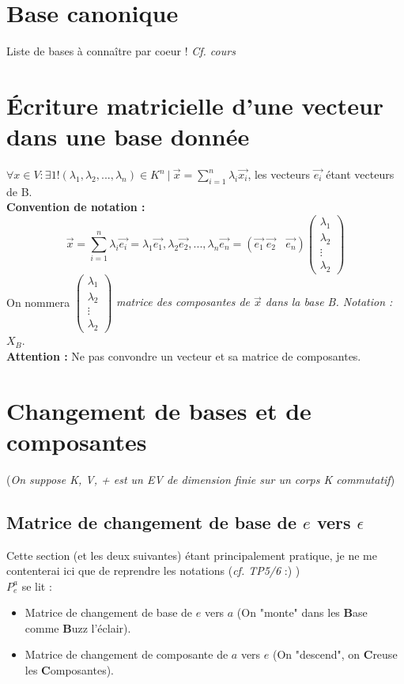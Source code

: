 \documentclass	[11pt, a4paper, openany]{book}
\begin{document}
\section{Base canonique}
Liste de bases à connaître par coeur ! \textit{Cf. cours}

\section{Écriture matricielle d'une vecteur dans une base donnée}
$\forall x \in V : \exists 1!(\lambda_{1}, \lambda_{2}, ..., \lambda_{n}) \in K^{n}\ |\ \vec{x} = \sum_{i=1}^{n} \lambda_{i}\vec{x_{i}}$, les vecteurs $\vec{e_{i}}$ étant vecteurs de B.\\
\textbf{Convention de notation :}\\
$$\vec{x} = \sum_{i=1}^{n}  \lambda_{i}\vec{e_{i}} = \lambda_{1}\vec{e_{1}}, \lambda_{2}\vec{e_{2}}, ..., \lambda_{n}\vec{e_{n}} = (\vec{e_{1}}\ \vec{e_{2}}\ \ \ \ \vec{e_{n}})\begin{pmatrix} 
\lambda_1 \\ 
\lambda_2 \\ 
\vdots\\ 
\lambda_2 \end{pmatrix}$$
On nommera $\begin{pmatrix} 
\lambda_1 \\ 
\lambda_2 \\ 
\vdots\\ 
\lambda_2 \end{pmatrix}$ \textit{matrice des composantes de $\vec{x}$ dans la base B. Notation : $X_B$}.
\\
\textbf{Attention :} Ne pas convondre un vecteur et sa matrice de 
composantes.


\section{Changement de bases et de composantes}
(\textit{On suppose K, V, + est un EV de dimension finie sur un corps K commutatif})\\
\subsection{Matrice de changement de base de $e$ vers $\epsilon$}
Cette section (et les deux suivantes) étant principalement pratique, je ne me contenterai ici que de reprendre les notations (\textit{cf. TP5/6} :) )\\
$P_e^a$ se lit :
\begin{itemize}
\item Matrice de changement de base de $e$ vers $a$ (On "monte" dans les \textbf{B}ase comme \textbf{B}uzz l'éclair).
\item Matrice de changement de composante de $a$ vers $e$ (On "descend", on \textbf{C}reuse les \textbf{C}omposantes).
\end{itemize}
\end{document}
